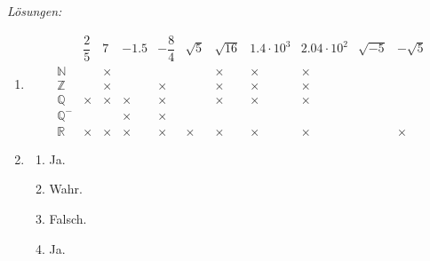 \clearpage
\emph{Lösungen:}

\begin{enumerate}
    \item
          \[
              \begin{array}{c|c|c|c|c|c|c|c|c|c|c}
                               & \dfrac{2}{5}   & 7               & -1.5      & -\dfrac{8}{4} & \sqrt{5} & \sqrt{16}
                               & 1.4 \cdot 10^3 & 2.04 \cdot 10^2 & \sqrt{-5} & -\sqrt{5}                            \\ \hline
                  \mathbb{N}   &                & \times          &           &               &          & \times
                               & \times         & \times          &           &                                      \\ \hline
                  \mathbb{Z}   &                & \times          &           & \times        &          & \times
                               & \times         & \times          &           &                                      \\ \hline
                  \mathbb{Q}   & \times         & \times          & \times    & \times        &          & \times
                               & \times         & \times          &           &                                      \\ \hline
                  \mathbb{Q}^- &                &                 & \times    & \times        &          &
                               &                &                 &           &                                      \\ \hline
                  \mathbb{R}   & \times         & \times          & \times    & \times        & \times   & \times
                               & \times         & \times          &           & \times
              \end{array}
          \]

    \item
          \begin{enumerate}
              \item Ja.
              \item Wahr.
              \item Falsch.
              \item Ja.
          \end{enumerate}


\end{enumerate}
